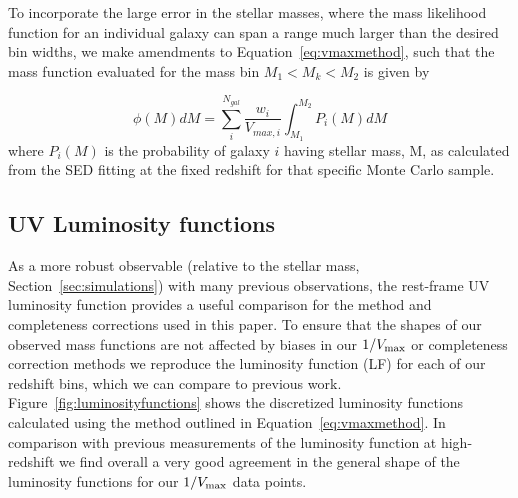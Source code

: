 To incorporate the large error in the stellar masses, where the mass likelihood function for an individual galaxy can span a range much larger than the desired bin widths, we make amendments to Equation~\ref{eq:vmaxmethod}, such that the mass function evaluated for the mass bin $M_{1} < M_{k} < M_{2}$ is given by

\begin{equation}\label{eq:vmaxpdf}
\phi(M) dM = \sum_{i}^{N_{gal}}  \frac{w_{i}}{V_{max,i}} \int_{M_{1}}^{M_{2}} P_{i}(M)dM
\end{equation}
where $P_{i}(M)$ is the probability of galaxy $i$ having stellar mass, M, as calculated from the SED fitting at the fixed redshift for that specific Monte Carlo sample.

\subsection{UV Luminosity functions}
As a more robust observable (relative to the stellar mass, Section~\ref{sec:simulations}) with many previous observations, the rest-frame UV luminosity function provides a useful comparison for the method and completeness corrections used in this paper. To ensure that the shapes of our observed mass functions are not affected by biases in our $1/V_{\rm{max}}$ or completeness correction methods we reproduce the luminosity function (LF) for each of our redshift bins, which we can compare to previous work. Figure~\ref{fig:luminosityfunctions} shows the discretized luminosity functions calculated using the method outlined in Equation~\ref{eq:vmaxmethod}. In comparison with previous measurements of the luminosity function at high-redshift we find overall a very good agreement in the general shape of the luminosity functions for our $1/V_{\rm{max}}$ data points.

